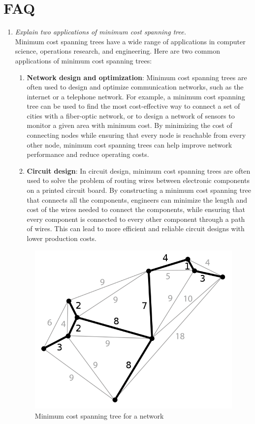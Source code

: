 \documentclass[11pt]{article}
\begin{document}
\section{FAQ}
\begin{enumerate}
    \item \textit{ Explain two applications of minimum cost spanning tree.}\\
    
          Minimum cost spanning trees have a wide range of applications in computer science, operations research, and engineering. Here are two common applications of minimum cost spanning trees:

          \begin{enumerate}
              \item \textbf{Network design and optimization}: Minimum cost spanning trees are often used to design and optimize communication networks, such as the internet or a telephone network. For example, a minimum cost spanning tree can be used to find the most cost-effective way to connect a set of cities with a fiber-optic network, or to design a network of sensors to monitor a given area with minimum cost. By minimizing the cost of connecting nodes while ensuring that every node is reachable from every other node, minimum cost spanning trees can help improve network performance and reduce operating costs.

              \item \textbf{Circuit design}: In circuit design, minimum cost spanning trees are often used to solve the problem of routing wires between electronic components on a printed circuit board. By constructing a minimum cost spanning tree that connects all the components, engineers can minimize the length and cost of the wires needed to connect the components, while ensuring that every component is connected to every other component through a path of wires. This can lead to more efficient and reliable circuit designs with lower production costs.

          \end{enumerate}


          \begin{figure}[H]
              \centering
              \includegraphics[width=.45\textwidth]{figures/640px-Minimum_spanning_tree.svg.png}
              \caption{Minimum cost spanning tree for a network}
          \end{figure}



\end{enumerate}
\end{document}
